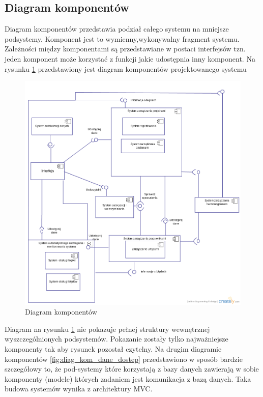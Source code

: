 \subsection{Diagram komponentów}
Diagram komponentów przedstawia podział całego systemu na mniejsze podsystemy. Komponent jest to wymienny,wykonywalny fragment systemu. Zależności między komponentami są przedstawiane w postaci interfejsów tzn. jeden komponent może korzystać z funkcji jakie udostępnia inny komponent. Na rysunku \ref{fig:diagram_komponentow} przedstawiony jest diagram komponentów projektowanego systemu

\begin{figure}[h]
    \centering
    \includegraphics[scale=0.4]{diagramy/sekwencji_i_komponentow/diagram_komponentow.png}
    \caption{Diagram komponentów}
    \label{fig:diagram_komponentow}
\end{figure} 

Diagram na rysunku \ref{fig:diagram_komponentow} nie pokazuje pełnej struktury wewnętrznej wyszczególnionych podsystemów. Pokazanie zostały tylko najważniejsze komponenty tak aby rysunek pozostał czytelny. Na drugim diagramie komponentów \ref{fig:diag_kom_dane_dostep} przedstawiono w sposób bardzie szczegółowy to, że pod-systemy które korzystają z bazy danych zawierają w sobie komponenty (modele) których zadaniem jest komunikacja z bazą danych. Taka budowa systemów wynika z architektury MVC.

